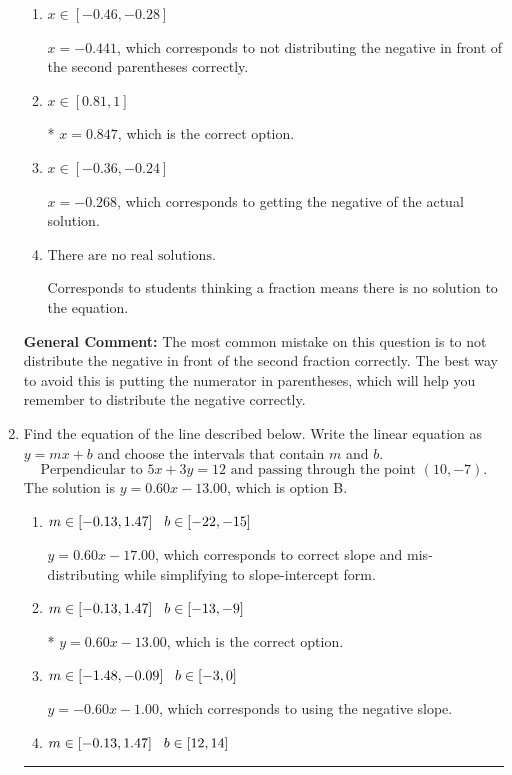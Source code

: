 \documentclass{extbook}[14pt]
\newcommand{\litem}[1]{\item #1

\rule{\textwidth}{0.4pt}}
\begin{document}
\begin{enumerate}
{\begin{enumerate}[label=\Alph*.]
$x = 0.441$, which corresponds to not distributing the negative in front of the first parentheses correctly.
\item \( x \in [-0.46, -0.28] \)

$x = -0.441$, which corresponds to not distributing the negative in front of the second parentheses correctly.
\item \( x \in [0.81, 1] \)

* $x = 0.847$, which is the correct option.
\item \( x \in [-0.36, -0.24] \)

$x = -0.268$, which corresponds to getting the negative of the actual solution.
\item \( \text{There are no real solutions.} \)

Corresponds to students thinking a fraction means there is no solution to the equation.
\end{enumerate}

\textbf{General Comment:} The most common mistake on this question is to not distribute the negative in front of the second fraction correctly. The best way to avoid this is putting the numerator in parentheses, which will help you remember to distribute the negative correctly.
}
\litem{
Find the equation of the line described below. Write the linear equation as $ y=mx+b $ and choose the intervals that contain $m$ and $b$.
\[ \text{Perpendicular to } 5 x + 3 y = 12 \text{ and passing through the point } (10, -7). \]The solution is \( y = 0.60x - 13.00 \), which is option B.\begin{enumerate}[label=\Alph*.]
\item \( m \in [-0.13, 1.47] \hspace*{3mm} b \in [-22, -15] \)

 $y = 0.60x - 17.00$, which corresponds to correct slope and mis-distributing while simplifying to slope-intercept form.
\item \( m \in [-0.13, 1.47] \hspace*{3mm} b \in [-13, -9] \)

* $y = 0.60x - 13.00$, which is the correct option.
\item \( m \in [-1.48, -0.09] \hspace*{3mm} b \in [-3, 0] \)

 $y = -0.60x - 1.00$, which corresponds to using the negative slope.
\item \( m \in [-0.13, 1.47] \hspace*{3mm} b \in [12, 14] \)


\end{enumerate}}
\end{enumerate}
\end{document}
